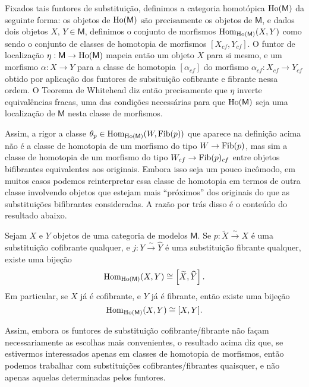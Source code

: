 Fixados tais funtores de substituição, definimos a categoria homotópica $\mathrm{Ho}(\mathsf{M})$ da seguinte forma: os objetos de $\mathrm{Ho}(\mathsf{M})$ são precisamente os objetos de $\mathsf{M}$, e dados dois objetos $X,\, Y \in \mathsf{M}$, definimos o conjunto de morfismos $\mathrm{Hom}_{\mathrm{Ho}(\mathsf{M})}(X,Y)$ como sendo o conjunto de classes de homotopia de morfismos $[X_{cf},Y_{cf}]$.
O funtor de localização $\eta: \mathsf{M} \to \mathrm{Ho}(\mathsf{M})$ mapeia então um objeto $X$ para si mesmo, e um morfismo $\alpha: X \to Y$ para a classe de homotopia $[\alpha_{cf}]$ do morfismo $\alpha_{cf}: X_{cf} \to Y_{cf}$ obtido por aplicação dos funtores de subsituição cofibrante e fibrante nessa ordem.
O Teorema de Whitehead diz então precisamente que $\eta$ inverte equivalências fracas, uma das condições necessárias para que $\mathrm{Ho}(\mathsf{M})$ seja uma localização de $\mathsf{M}$ nesta classe de morfismos.

Assim, a rigor a classe $\theta_{p} \in \mathrm{Hom}_{\mathrm{Ho}(\mathsf{M})}(W,\mathrm{Fib}(p))$ que aparece na definição acima não é a classe de homotopia de um morfismo do tipo $W \to \mathrm{Fib}(p)$, mas sim a classe de homotopia de um morfismo do tipo $W_{cf} \to \mathrm{Fib}(p)_{cf}$ entre objetos bifibrantes equivalentes aos originais.
Embora isso seja um pouco incômodo, em muitos casos podemos reinterpretar essa classe de homotopia em termos de outra classe involvendo objetos que estejam mais ``próximos'' dos originais do que as substituições bifibrantes consideradas.
A razão por trás disso é o conteúdo do resultado abaixo.

\begin{prop}
  Sejam $X$ e $Y$ objetos de uma categoria de modelos $\mathsf{M}$.
  Se $p: \widetilde{X} \overset{\sim}{\to} X$ é uma substituição cofibrante qualquer, e $j: Y \overset{\sim}{\to} \widehat{Y}$ é uma substituição fibrante qualquer, existe uma bijeção
  \begin{displaymath}
    \mathrm{Hom}_{\mathrm{Ho}(\mathsf{M})}(X,Y) \cong \left[ \widetilde{X}, \widehat{Y} \right].
  \end{displaymath}
  Em particular, se $X$ já é cofibrante, e $Y$ já é fibrante, então existe uma bijeção
  \begin{displaymath}
    \mathrm{Hom}_{\mathrm{Ho}(\mathsf{M})}(X,Y) \cong [X,Y].
  \end{displaymath}
\end{prop}

Assim, embora os funtores de substituição cofibrante/fibrante não façam necessariamente as escolhas mais convenientes, o resultado acima diz que, se estivermos interessados apenas em classes de homotopia de morfismos, então podemos trabalhar com substituições cofibrantes/fibrantes quaisquer, e não apenas aquelas determinadas pelos funtores.

